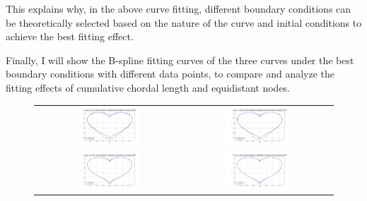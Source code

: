 \documentclass[a4paper]{article}
\begin{document}
\begin{sloppypar}
This explains why, in the above curve fitting, different boundary conditions
can be theoretically selected based on the nature of the curve and initial
conditions to achieve the best fitting effect.

Finally, I will show the B-spline fitting curves of the three curves under the
best boundary conditions with different data points, to compare and analyze the
fitting effects of cumulative chordal length and equidistant nodes.

\begin{figure}[H]
  \centering
  \begin{tabular}{cc}
    \includegraphics[width=0.45\textwidth]{../figure/problemE/N_10_r1_BSpline_Equidistant_NOT.png}  &
    \includegraphics[width=0.45\textwidth]{../figure/problemE/N_10_r1_BSpline_ChordalLength_NOT.png}  \\
    \includegraphics[width=0.45\textwidth]{../figure/problemE/N_40_r1_BSpline_Equidistant_NOT.png}  &
    \includegraphics[width=0.45\textwidth]{../figure/problemE/N_40_r1_BSpline_ChordalLength_NOT.png}  \\

\end{tabular}
\end{figure}
\end{sloppypar}
\end{document}
